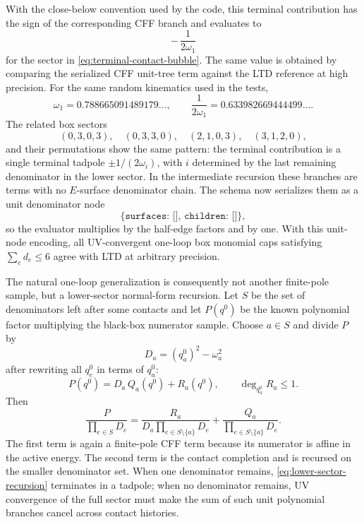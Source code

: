 \documentclass[11pt,a4paper]{report}
\begin{document}
With the close-below convention used by the code, this terminal contribution
has the sign of the corresponding CFF branch and evaluates to
\[
  -\,\frac{1}{2\omega_1}
\]
for the sector in \eqref{eq:terminal-contact-bubble}.  The same value is
obtained by comparing the serialized CFF unit-tree term against the LTD
reference at high precision.  For the same random kinematics used in the tests,
\[
  \omega_1=0.788665091489179\ldots,\qquad
  \frac{1}{2\omega_1}=0.633982669444499\ldots .
\]
The related box sectors
\[
  (0,3,0,3),\quad (0,3,3,0),\quad (2,1,0,3),
  \quad (3,1,2,0),
\]
and their permutations show the same pattern: the terminal contribution is a single
terminal tadpole \(\pm1/(2\omega_i)\), with \(i\) determined by the last
remaining denominator in the lower sector.  In the intermediate recursion these
branches are terms with no \(E\)-surface denominator chain.  The schema now
serializes them as a unit denominator node
\[
  \texttt{\{surfaces: [], children: []\}},
\]
so the evaluator multiplies by the half-edge factors and by one.  With this
unit-node encoding, all UV-convergent one-loop box monomial caps satisfying
\(\sum_e d_e\le6\) agree with LTD at arbitrary precision.

The natural one-loop generalization is consequently not another finite-pole
sample, but a lower-sector normal-form recursion.  Let \(S\) be the set of
denominators left after some contacts and let \(P(q^0)\) be the known
polynomial factor multiplying the black-box numerator sample.  Choose
\(a\in S\) and divide \(P\) by
\[
  D_a=(q_a^0)^2-\omega_a^2
\]
after rewriting all \(q_e^0\) in terms of \(q_a^0\):
\begin{equation}
  P(q^0)=D_a\,Q_a(q^0)+R_a(q^0),
  \qquad
  \deg_{q_a^0} R_a\le1 .
  \label{eq:lower-sector-normal-form}
\end{equation}
Then
\begin{equation}
  \frac{P}{\prod_{e\in S}D_e}
  =
  \frac{R_a}{D_a\prod_{e\in S\setminus\{a\}}D_e}
  +
  \frac{Q_a}{\prod_{e\in S\setminus\{a\}}D_e}.
  \label{eq:lower-sector-recursion}
\end{equation}
The first term is again a finite-pole CFF term because its numerator is affine
in the active energy.  The second term is the contact completion and is
recursed on the smaller denominator set.  When one denominator remains,
\eqref{eq:lower-sector-recursion} terminates in a tadpole; when no denominator
remains, UV convergence of the full sector must make the sum of such unit
polynomial branches cancel across contact histories.
\end{document}
